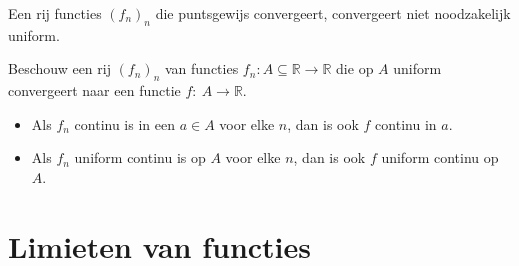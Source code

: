 \documentclass[main.tex]{subfiles}
\begin{document}
\begin{tvb}
  Een rij functies $(f_{n})_{n}$ die puntsgewijs convergeert, convergeert niet noodzakelijk uniform.
\end{tvb}

\begin{st}
  Beschouw een rij $(f_{n})_{n}$ van functies $f_{n}: A \subseteq \mathbb{R} \rightarrow \mathbb{R}$ die op $A$ uniform convergeert naar een functie $f:\ A \rightarrow \mathbb{R}$.
  \begin{itemize}
  \item Als $f_{n}$ continu is in een $a\in A$ voor elke $n$, dan is ook $f$ continu in $a$.
  \item Als $f_{n}$ uniform continu is op $A$ voor elke $n$, dan is ook $f$ uniform continu op $A$. 
  \end{itemize}

\end{st}

\section{Limieten van functies}
\label{sec:limi-van-funct}
\end{document}
